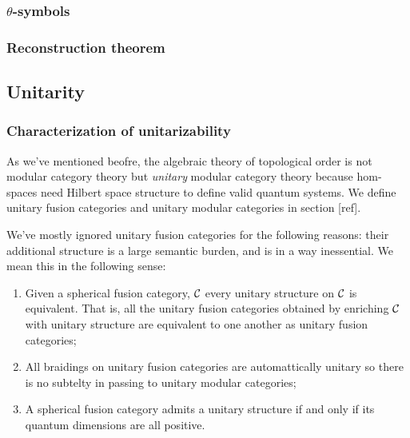 \subsubsection{$\theta$-symbols}

\subsubsection{Reconstruction theorem}

\subsection{Unitarity}

\subsubsection{Characterization of unitarizability}



As we've mentioned beofre, the algebraic theory of topological order is not modular category theory but {\em unitary} modular category theory because hom-spaces need Hilbert space structure to define valid quantum systems. We define unitary fusion categories and unitary modular categories in section [ref].

We've mostly ignored unitary fusion categories for the following reasons: their additional structure is a large semantic burden, and is in a way inessential. We mean this in the following sense:

\begin{enumerate}
\item Given a spherical fusion category, ${\mathcal C}$ every unitary structure on ${\mathcal C}$ is equivalent. That is, all the unitary fusion categories obtained by enriching ${\mathcal C}$ with unitary structure are equivalent to one another as unitary fusion categories;

\item All braidings on unitary fusion categories are automattically unitary so there is no subtelty in passing to unitary modular categories;

\item A spherical fusion category admits a unitary structure if and only if its quantum dimensions are all positive.
\end{enumerate}

